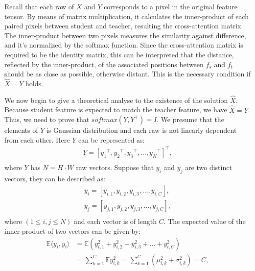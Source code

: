 \documentclass[10pt,twocolumn,letterpaper]{article}
\begin{document}
Recall that each raw of $X$ and $Y$ corresponds to a pixel in the original feature tensor. By means of matrix multiplication, it calculates the inner-product of each paired pixels between student and teacher, resulting the cross-attention matrix. The inner-product between two pixels measures the similarity against difference, and it's normalized by the softmax function. Since the cross-attention matrix is required to be the identity matrix, this can be interpreted that the distance, reflected by the inner-product, of the associated positions between $f_s$ and $f_t$ should be as close as possible, otherwise distant. This is the necessary condition if $\hat{X}=Y$ holds.

We now begin to give a theoretical analyse to the existence of the solution $\hat{X}$. Because student feature is expected to match the teacher feature, we have $\hat{X}=Y$. Thus, we need to prove that $softmax(Y,Y^{\top})=I$. We presume that the elements of $Y$ is Gaussian distribution and each raw is not linearly dependent from each other. Here $Y$ can be represented as:
\begin{equation}
\begin{aligned}
   Y=[{y_1}^{\top},{y_2}^{\top},{y_3}^{\top},\dots,{y_N}^{\top}]^{\top},\\
\end{aligned}
\end{equation}
\noindent where $Y$ has $N=H\cdot W$ raw vectors. Suppose that $y_i$ and $y_j$ are two distinct vectors, they can be described as:
\begin{equation}
\begin{aligned}
   y_i=[y_{i,1},y_{i,2},y_{i,3},\dots,y_{i,C}],\\
   y_j=[y_{j,1},y_{j,2},y_{j,3},\dots,y_{j,C}],\\
\end{aligned}
\end{equation}
where $(1\leq i,j\leq N)$ and each vector is of length $C$. The expected value of the inner-product of two vectors can be given by:
\begin{equation}
\label{eq:in_prd_same}
    \begin{aligned}
       \mathbb{E}\langle y_i,y_i\rangle &= \mathbb{E}(y_{i,1}^2+y_{i,2}^2+y_{i,3}^2+\dots+y_{i,C}^2) \\
       &=\sum_{k=1}^{C}\mathbb{E}y_{i,k}^2= \sum_{k=1}^{C}(\mu_{i,k}^2+\sigma_{i,k}^2)=C ,
    \end{aligned}
\end{equation}
\end{document}
